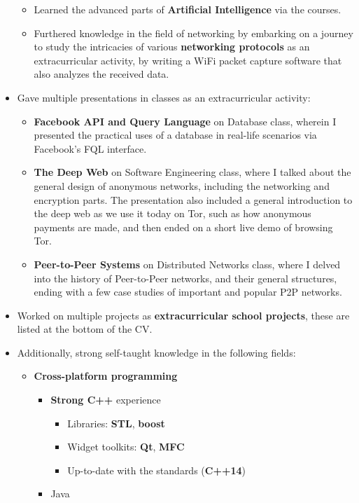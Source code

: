 \documentclass[11pt,a4paper]{article}
\begin{document}
\begin{itemize}
\begin{itemize}
		\item	Learned the advanced parts of \textbf{Artificial Intelligence} via the courses.
		\item	Furthered knowledge in the field of networking by embarking on a journey to study the intricacies of various \textbf{networking protocols} as an extracurricular activity, by writing a WiFi packet capture software that also analyzes the received data.
		\end{itemize}
	\item	Gave multiple presentations in classes as an extracurricular activity:
		\begin{itemize}
		\item	\textbf{Facebook API and Query Language} on Database class, wherein I presented the practical uses of a database in real-life scenarios via Facebook's FQL interface.
		\item	\textbf{The Deep Web} on Software Engineering class, where I talked about the general design of anonymous networks, including the networking and encryption parts. The presentation also included a general introduction to the deep web as we use it today on Tor, such as how anonymous payments are made, and then ended on a short live demo of browsing Tor.
		\item	\textbf{Peer-to-Peer Systems} on Distributed Networks class, where I delved into the history of Peer-to-Peer networks, and their general structures, ending with a few case studies of important and popular P2P networks.
		\end{itemize}
	\item	Worked on multiple projects as \textbf{extracurricular school projects}, these are listed at the bottom of the CV.
	\item	Additionally, strong self-taught knowledge in the following fields:
		\begin{itemize}
		\item	\textbf{Cross-platform programming}
			\begin{itemize}
			\item	\textbf{Strong C++} experience
				\begin{itemize}
				\item	Libraries: \textbf{STL}, \textbf{boost}
				\item	Widget toolkits: \textbf{Qt}, \textbf{MFC}
				\item	Up-to-date with the standards (\textbf{C++14})
				\end{itemize}
			\item	Java

\end{itemize}
\end{itemize}
\end{itemize}
\end{document}
